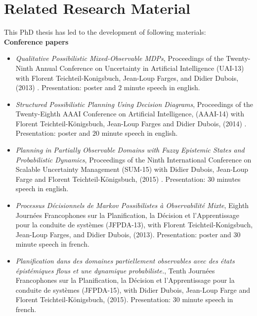 \chapter*{Related Research Material}

This PhD thesis has led to the development of following materials:\\

\textbf{Conference papers}
\begin{itemize}
\item \textit{Qualitative {P}ossibilistic {M}ixed-{O}bservable {MDP}s}, 
Proceedings of the Twenty-Ninth Annual Conference on Uncertainty in Artificial Intelligence (UAI-13) 
with Florent Teichteil-Konigsbuch, Jean-Loup Farges, and Didier Dubois, (2013) \cite{Drougard13}. Presentation: poster and $2$ minute speech in english.
\item \textit{Structured Possibilistic Planning Using Decision Diagrams}, 
Proceedings of the Twenty-Eighth {AAAI} Conference on Artificial Intelligence,
(AAAI-14) with Florent Teichteil{-}K{\"{o}}nigsbuch, Jean-Loup Farges and Didier Dubois,
(2014) \cite{DBLP:conf/aaai/DrougardTFD14}. Presentation: poster and $20$ minute speech in english.
\item \textit{Planning in Partially Observable Domains with Fuzzy Epistemic States and Probabilistic Dynamics},
Proceedings of the Ninth International Conference on Scalable Uncertainty Management (SUM-15)
with Didier Dubois, Jean-Loup Farge and Florent Teichteil-K\"onigsbuch, (2015) \cite{DBLP:conf/sum/DrougardDFT15}. Presentation: $30$ minutes speech in english.
\item \textit{Processus D\'ecisionnels de Markov Possibilistes \`a Observabilit\'e Mixte},
Eighth Journ\'ees Francophones sur la Planification, la D\'ecision et l'Apprentissage pour la conduite de syst\`emes (JFPDA-13),
with Florent Teichteil-Konigsbuch, Jean-Loup Farges, and Didier Dubois, (2013). Presentation: poster and $30$ minute speech in french.
\item \textit{Planification dans des domaines partiellement
observables avec des \'etats \'epist\'emiques flous
et une dynamique probabiliste.},
Tenth Journ\'ees Francophones sur la Planification, la D\'ecision et l'Apprentissage pour la conduite de syst\`emes (JFPDA-15),
with Didier Dubois, Jean-Loup Farge and Florent Teichteil-K\"onigsbuch, (2015). Presentation: $30$ minute speech in french.
\end{itemize}

